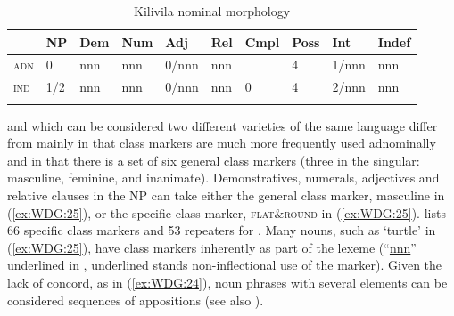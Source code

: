 \documentclass[output=collectionpaper]{langsci/langscibook}
\begin{document}
%

\begin{table}
\caption{Kilivila nominal morphology}
\begin{tabular}{>{\scshape}l*{9}{l}}
  \lsptoprule
  &	NP	&	Dem	&	Num	&	Adj	&	Rel	&	Cmpl	&	Poss	&	Int	&	Indef	\\
\midrule
adn	&	0	&	nnn	&	nnn	&	0/nnn	&	nnn	&		&	4	&	1/nnn	&	nnn	\\
ind	&	1/2	&	nnn	&	nnn	&	0/nnn	&	nnn	&	0	&	4	&	2/nnn	&	nnn	\\
\lspbottomrule
\end{tabular}
\label{tab:WDG:6}
\end{table}

 and  \textendash{} which can be considered two different varieties of the same language \textendash{} differ from  mainly in that class markers are much more frequently used adnominally and in that there is a set of six general class markers (three in the singular: masculine, feminine, and inanimate). Demonstratives, numerals, adjectives and relative clauses in the NP can take either the general class marker, masculine in (\ref{ex:WDG:25}), or the specific class marker, \textsc{flat\&round} in (\ref{ex:WDG:25}). \cite[88--100]{Seifart2005} lists 66 specific class markers and 53 repeaters for . Many nouns, such as `turtle' in (\ref{ex:WDG:25}), have class markers inherently as part of the lexeme (``\uline{nnn}'' underlined in , underlined stands non-inflectional use of the marker). Given the lack of concord, as in (\ref{ex:WDG:24}), noun phrases with several elements can be considered sequences of appositions (see also \citealt{Passer2016b}).

\begin{table}
\caption{Bora nominal morphology\label{tab:WDG:7}}
\end{table}
\end{document}
